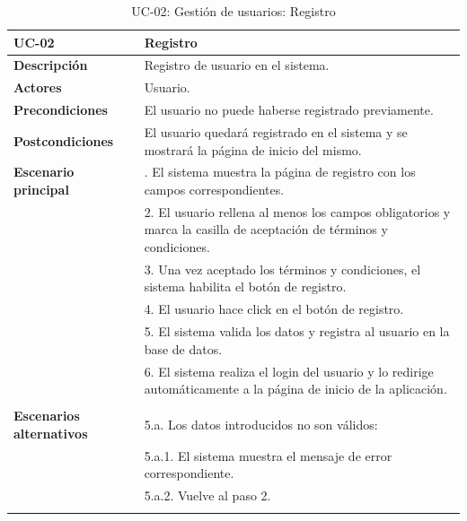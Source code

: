 \begin{table}[H]
  \begin{center}
    \begin{tabularx}{16.4cm}{|l|X|}
      \hline
      \textbf{UC-02} & \textbf{Registro}\\
      \hline
      \textbf{Descripción} & Registro de usuario en el sistema.\\
      \hline
      \textbf{Actores} & Usuario.\\
      \hline
      \textbf{Precondiciones} & El usuario no puede haberse registrado previamente.\\
      \hline
      \textbf{Postcondiciones} & El usuario quedará registrado en el sistema y se mostrará la página de inicio del mismo.\\
      \hline
      \textbf{Escenario principal} & \smallskip 1. El sistema muestra la página de registro con los campos correspondientes.\\
      & 2. El usuario rellena al menos los campos obligatorios y marca la casilla de aceptación de términos y condiciones. \\
      & 3. Una vez aceptado los términos y condiciones, el sistema habilita el botón de registro. \\ 
      & 4. El usuario hace click en el botón de registro.\\
      & 5. El sistema valida los datos y registra al usuario en la base de datos.\\
      & 6. El sistema realiza el login del usuario y lo redirige automáticamente a la página de inicio de la aplicación.\\
      & \\
      \hline
      \textbf{Escenarios alternativos} & \smallskip 5.a. Los datos introducidos no son válidos:\\
      & \hspace{0.3cm} 5.a.1. El sistema muestra el mensaje de error correspondiente.\\
      & \hspace{0.3cm} 5.a.2. Vuelve al paso 2.\\
      & \\
      \hline
    \end{tabularx}
    \caption{UC-02: Gestión de usuarios: Registro}
    \label{tab:CU-registro}
  \end{center}
\end{table}


